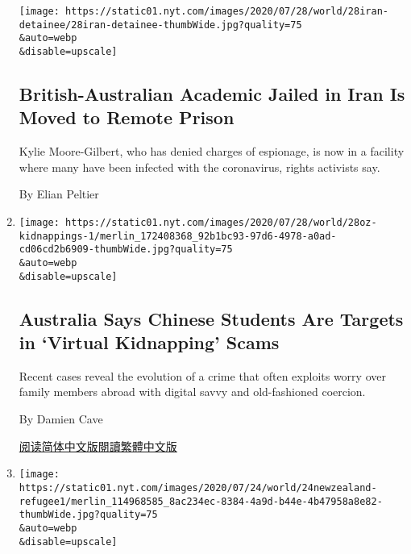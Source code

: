 \begin{enumerate}
  \texttt{[image: https://static01.nyt.com/images/2020/07/28/world/28iran-detainee/28iran-detainee-thumbWide.jpg?quality=75\\\&auto=webp\\\&disable=upscale]}

  \hypertarget{british-australian-academic-jailed-in-iran-is-moved-to-remote-prison}{%
  \subsection{British-Australian Academic Jailed in Iran Is Moved to
  Remote
  Prison}\label{british-australian-academic-jailed-in-iran-is-moved-to-remote-prison}}

  Kylie Moore-Gilbert, who has denied charges of espionage, is now in a
  facility where many have been infected with the coronavirus, rights
  activists say.

  By Elian Peltier
\item
  \href{/2020/07/28/world/australia/chinese-students-virtual-kidnapping.html}{}

  \texttt{[image: https://static01.nyt.com/images/2020/07/28/world/28oz-kidnappings-1/merlin\_172408368\_92b1bc93-97d6-4978-a0ad-cd06cd2b6909-thumbWide.jpg?quality=75\\\&auto=webp\\\&disable=upscale]}

  \hypertarget{australia-says-chinese-students-are-targets-in-virtual-kidnapping-scams}{%
  \subsection{Australia Says Chinese Students Are Targets in `Virtual
  Kidnapping'
  Scams}\label{australia-says-chinese-students-are-targets-in-virtual-kidnapping-scams}}

  Recent cases reveal the evolution of a crime that often exploits worry
  over family members abroad with digital savvy and old-fashioned
  coercion.

  By Damien Cave

  \href{https://cn.nytimes.com/asia-pacific/20200729/chinese-students-virtual-kidnapping/}{阅读简体中文版}\href{https://cn.nytimes.com/asia-pacific/20200729/chinese-students-virtual-kidnapping/zh-hant/}{閱讀繁體中文版}
\item
  \href{/2020/07/24/world/australia/behrouz-boochani-asylum-new-zealand.html}{}

  \texttt{[image: https://static01.nyt.com/images/2020/07/24/world/24newzealand-refugee1/merlin\_114968585\_8ac234ec-8384-4a9d-b44e-4b47958a8e82-thumbWide.jpg?quality=75\\\&auto=webp\\\&disable=upscale]}


\end{enumerate}
